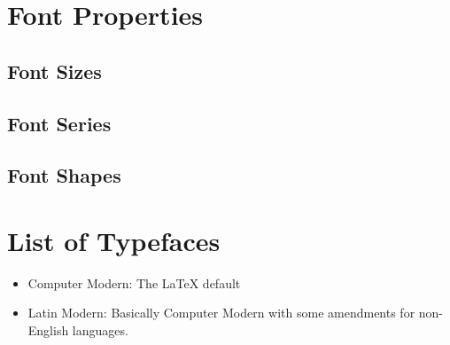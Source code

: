 \documentclass[a4paper,oneside,11pt]{article}
\begin{document}
\section{Font Properties}
\label{sec:font-props}

\subsection{Font Sizes}
\label{subsec:font-sizes}

\subsection{Font Series}
\label{subsec:font-series}

\subsection{Font Shapes}
\label{subsec:font-shapes}

\section{List of Typefaces}
\label{sec:tflist}

\begin{itemize}
    \item Computer Modern: The \LaTeX{} default
    \item  
        Latin  Modern: Basically  Computer  Modern with  some  amendments  for
        non-English languages.
\end{itemize}
\end{document}
